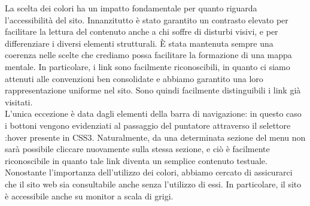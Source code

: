 La scelta dei colori ha un impatto fondamentale per quanto riguarda l'accessibilità del sito. Innanzitutto è stato garantito un contrasto elevato per facilitare la lettura del contenuto anche a chi soffre di disturbi visivi, e per differenziare i diversi elementi strutturali. È stata mantenuta sempre una coerenza nelle scelte che crediamo possa facilitare la formazione di una mappa mentale. In particolare, i link sono facilmente riconoscibili, in quanto ci siamo attenuti alle convenzioni ben consolidate e abbiamo garantito una loro rappresentazione uniforme nel sito. Sono quindi facilmente distinguibili i link già visitati.\\
L'unica eccezione è data dagli elementi della barra di navigazione: in questo caso i bottoni vengono evidenziati al passaggio del puntatore attraverso il selettore :hover presente in CSS3. Naturalmente, da una determinata sezione del menu non sarà possibile cliccare nuovamente sulla stessa sezione, e ciò è facilmente riconoscibile in quanto tale link diventa un semplice contenuto testuale.\\
Nonostante l'importanza dell'utilizzo dei colori, abbiamo cercato di assicurarci che il sito web sia consultabile anche senza l'utilizzo di essi. In particolare, il sito è accessibile anche su monitor a scala di grigi.